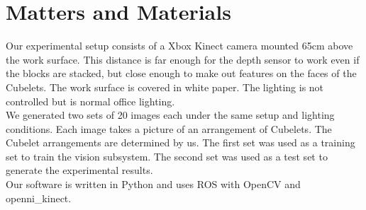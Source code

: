 \documentclass[conference]{IEEEtran}
\begin{document}
%



\section{Matters and Materials}
Our experimental setup consists of a Xbox Kinect camera mounted 65cm above the work surface. This distance is far enough for the depth sensor to work even if the blocks are stacked, but close enough to make out features on the faces of the Cubelets. The work surface is covered in white paper. The lighting is not controlled but is normal office lighting.
\\[6pt]
We generated two sets of 20 images each under the same setup and lighting conditions. Each image takes a picture of an arrangement of Cubelets. The Cubelet arrangements are determined by us. The first set was used as a training set to train the vision subsystem. The second set was used as a test set to generate the experimental results.
\\[6pt]
Our software is written in Python and uses ROS with OpenCV and openni\_kinect.
\end{document}
